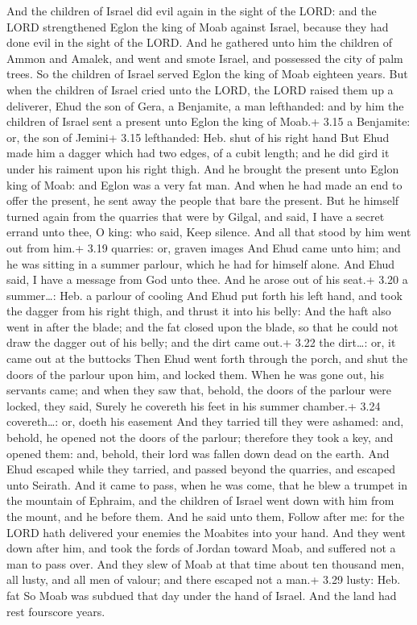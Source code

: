  And the children of Israel did evil again in the sight
of the LORD: and the LORD strengthened Eglon the king of Moab against
Israel, because they had done evil in the sight of the LORD.
 And he gathered unto him the children of Ammon and Amalek,
and went and smote Israel, and possessed the city of palm trees.
 So the children of Israel served Eglon the king of Moab
eighteen years.  But when the children of Israel cried unto
the LORD, the LORD raised them up a deliverer, Ehud the son of Gera, a
Benjamite, a man lefthanded: and by him the children of Israel sent a
present unto Eglon the king of Moab.+ 3.15 a Benjamite: or, the son of
Jemini+ 3.15 lefthanded: Heb. shut of his right hand  But
Ehud made him a dagger which had two edges, of a cubit length; and he
did gird it under his raiment upon his right thigh.  And he
brought the present unto Eglon king of Moab: and Eglon was a very fat
man.  And when he had made an end to offer the present, he
sent away the people that bare the present.  But he himself
turned again from the quarries that were by Gilgal, and said, I have a
secret errand unto thee, O king: who said, Keep silence. And all that
stood by him went out from him.+ 3.19 quarries: or, graven images
 And Ehud came unto him; and he was sitting in a summer
parlour, which he had for himself alone. And Ehud said, I have a message
from God unto thee. And he arose out of his seat.+ 3.20 a summer\ldots:
Heb. a parlour of cooling  And Ehud put forth his left
hand, and took the dagger from his right thigh, and thrust it into his
belly:  And the haft also went in after the blade; and the
fat closed upon the blade, so that he could not draw the dagger out of
his belly; and the dirt came out.+ 3.22 the dirt\ldots: or, it came out
at the buttocks  Then Ehud went forth through the porch,
and shut the doors of the parlour upon him, and locked them.
 When he was gone out, his servants came; and when they saw
that, behold, the doors of the parlour were locked, they said, Surely he
covereth his feet in his summer chamber.+ 3.24 covereth\ldots: or, doeth
his easement  And they tarried till they were ashamed: and,
behold, he opened not the doors of the parlour; therefore they took a
key, and opened them: and, behold, their lord was fallen down dead on
the earth.  And Ehud escaped while they tarried, and passed
beyond the quarries, and escaped unto Seirath.  And it came
to pass, when he was come, that he blew a trumpet in the mountain of
Ephraim, and the children of Israel went down with him from the mount,
and he before them.  And he said unto them, Follow after
me: for the LORD hath delivered your enemies the Moabites into your
hand. And they went down after him, and took the fords of Jordan toward
Moab, and suffered not a man to pass over.  And they slew
of Moab at that time about ten thousand men, all lusty, and all men of
valour; and there escaped not a man.+ 3.29 lusty: Heb. fat 
So Moab was subdued that day under the hand of Israel. And the land had
rest fourscore years.

